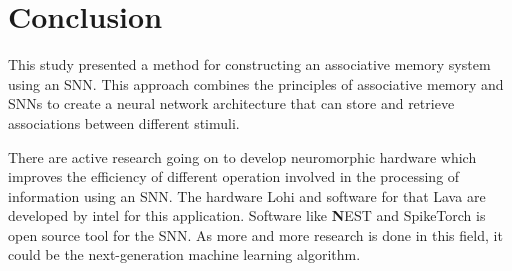 \chapter{Conclusion}%

This study presented a method for constructing an associative memory system
using an SNN. This approach combines the principles of associative memory and
SNNs to create a neural network architecture that can store and retrieve
associations between different stimuli.

There are active research going on to develop neuromorphic hardware which
improves the efficiency of different operation involved in the processing of
information using an SNN. The hardware Lohi\cite{lohi} and software for that Lava\cite{lava} are
developed by intel for this application. Software like \textbf NEST\cite{nest} and
SpikeTorch\cite{spiketorch} is open source tool for the SNN. As more and more research is done
in this field, it could be the next-generation machine learning algorithm.